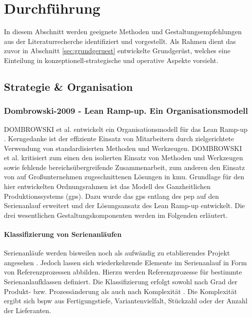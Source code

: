 
\chapter{Durchführung}\label{sec:durchfuehrung}
In diesem Abschnitt werden geeignete Methoden und Gestaltungsempfehlungen aus der Literaturrecherche identifiziert und vorgestellt. Als Rahmen dient das zuvor in Abschnitt \ref{sec:grundgeruest}
entwickelte Grundgerüst, welches eine Einteilung in konzeptionell-strategische und operative Aspekte vorsieht. 

\section{Strategie \& Organisation}

\subsection*{Dombrowski-2009 - Lean Ramp-up. Ein Organisationsmodell}\label{dom09}

DOMBROWSKI et al. entwickelt ein Organisationsmodell für das Lean Ramp-up \autocite{Dombrowski2009}. Kerngedanke ist der effiziente Einsatz von Mitarbeitern durch zielgerichtete Verwendung von standardisierten Methoden und Werkzeugen. DOMBROWSKI et al. kritisiert zum einen den isolierten Einsatz von Methoden und Werkzeugen sowie fehlende bereichsübergreifende Zusammenarbeit, zum anderen den Einsatz von auf Großunternehmen zugeschnittenen Lösungen in \gls{kmu}. 
Grundlage für den hier entwickelten Ordnungsrahmen ist das Modell des Ganzheitlichen Produktionssystems (\gls{gps}). Dazu wurde das \gls{gps} entlang des \gls{pep} auf den Serienanlauf erweitert und der Lösungsansatz des Lean Ramp-up entwickelt. Die drei wesentlichen Gestaltungskomponenten werden im Folgenden erläutert. 

\subsubsection{Klassifizierung von Serienanläufen}
Serienanläufe werden bisweilen noch als aufwändig zu etablierendes Projekt angesehen \autocite{Kuhn2002}. Jedoch lassen sich wiederkehrende Elemente im Serienanlauf in Form von Referenzprozessen abbilden. Hierzu werden Referenzprozesse für bestimmte Serienanlaufklassen definiert. Die Klassifizierung erfolgt sowohl nach Grad der Produkt- bzw. Prozessänderung \autocite{Kuhn2002, Hertrampf2008} als auch nach Komplexität
.
Die Komplexität ergibt sich \gls{bspw} aus Fertigungstiefe, Variantenvielfalt, Stückzahl oder der Anzahl der Lieferanten.

